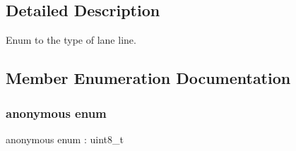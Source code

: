 \subsection{Detailed Description}
Enum to the type of lane line. 

\subsection{Member Enumeration Documentation}
\mbox{\label{structmaf__perception__interface_1_1LaneTypeEnum_acb7954b3a5a2b7849830be8f2d421906}} 
\subsubsection{\texorpdfstring{anonymous enum}{anonymous enum}}
{\footnotesize\ttfamily anonymous enum \+: uint8\+\_\+t}

